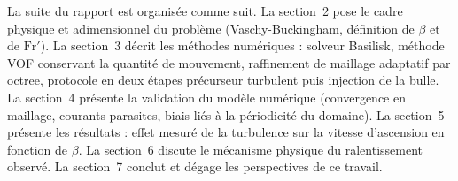La suite du rapport est organisée comme suit. La section~2 pose le cadre physique
et adimensionnel du problème (Vaschy-Buckingham, définition de
$\beta$ et de $\mathrm{Fr}'$). La section~3 décrit les méthodes numériques :
solveur Basilisk, méthode VOF conservant la quantité de mouvement, raffinement de
maillage adaptatif par octree, protocole en deux étapes précurseur turbulent puis
injection de la bulle. La section~4 présente la validation du modèle numérique
(convergence en maillage, courants parasites, biais liés à la périodicité du
domaine). La section~5 présente les résultats : effet mesuré de la turbulence sur
la vitesse d'ascension en fonction de $\beta$. La section~6 discute le mécanisme
physique du ralentissement observé. La section~7 conclut et dégage les
perspectives de ce travail.
